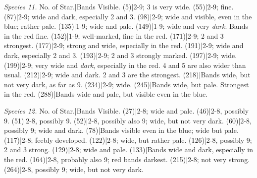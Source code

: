 \documentclass[a4paper, 12pt, oneside, polutonikogreek, english]{article}
\begin{document}
\emph{Species 11.} 
No. of Star.|Bands Visible. 
(5)|2-9; 3 is very wide. 
(55)|2-9; fine. 
(87)|2-9; wide and dark, especially 2 and 3. 
(98)|2-9; wide and visible, even in the blue; rather pale. 
(135)|1-9; wide and pale. 
(149)|1-9; wide and very \emph{dark}. Bands in the red fine. 
(152)|1-9; well-marked, fine in the red. 
(171)|2-9; 2 and 3 strongest. 
(177)|2-9; strong and wide, especially in the red. 
(191)|2-9; wide and dark, especially 2 and 3. 
(193)|2-9; 2 and 3 strongly marked. 
(197)|2-9; wide. 
(199)|2-9; very wide and \emph{dark}, especially in the red. 4 and 5 are also wider than usual. 
(212)|2-9; wide and dark. 2 and 3 are the strongest. 
(218)|Bands wide, but not very dark, as far as 9. 
(234)|2-9; wide. 
(245)|Bands wide, but pale. Strongest in the red. 
(288)|Bands wide and pale, but visible even in the blue. 

\emph{Species 12.} 
No. of Star.|Bands Visible. 
(27)|2-8; wide and pale. 
(46)|2-8, possibly 9. 
(51)|2-8, possibly 9. 
(52)|2-8, possibly also 9; wide, but not very dark. 
(60)|2-8, possibly 9; wide and dark. 
(78)|Bands visible even in the blue; wide but pale. 
(117)|2-8; feebly developed. 
(122)|2-8; wide, but rather pale. 
(126)|2-8, possibly 9; 2 and 3 strong. 
(129)|2-8; wide and pale. 
(133)|Bands wide and dark, especially in the red. 
(164)|2-8, probably also 9; red bands darkest. 
(215)|2-8; not very strong. 
(264)|2-8, possibly 9; wide, but not very dark. 
\end{document}
